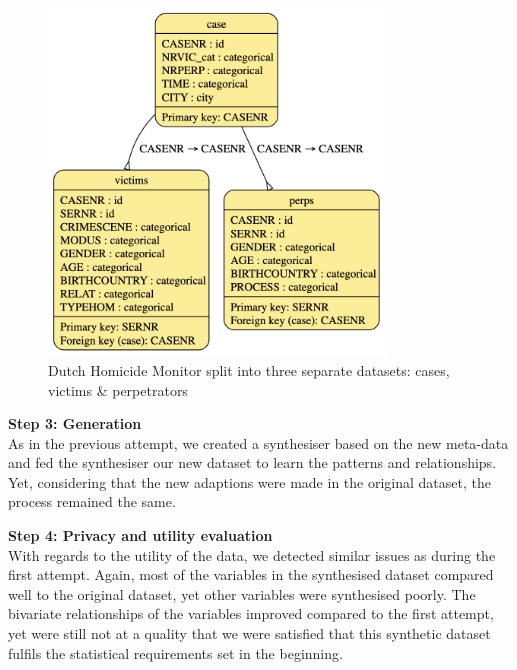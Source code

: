 \begin{figure}[H]
    \centering
    \includegraphics[width=0.8\textwidth]{Images/meta2.png}
    \caption{Dutch Homicide Monitor split into three separate datasets: cases, victims \& perpetrators}
    \label{fig:proof_1}
\end{figure}
\vspace{10pt}


\textbf{Step 3: Generation}\\
As in the previous attempt, we created a synthesiser based on the new meta-data and fed the synthesiser our new dataset to learn the patterns and relationships. Yet, considering that the new adaptions were made in the original dataset, the process remained the same.

\textbf{Step 4: Privacy and utility evaluation}\\
With regards to the utility of the data, we detected similar issues as during the first attempt. Again, most of the variables in the synthesised dataset compared well to the original dataset, yet other variables were synthesised poorly. The bivariate relationships of the variables improved compared to the first attempt, yet were still not at a quality that we were satisfied that this synthetic dataset fulfils the statistical requirements set in the beginning. \\

